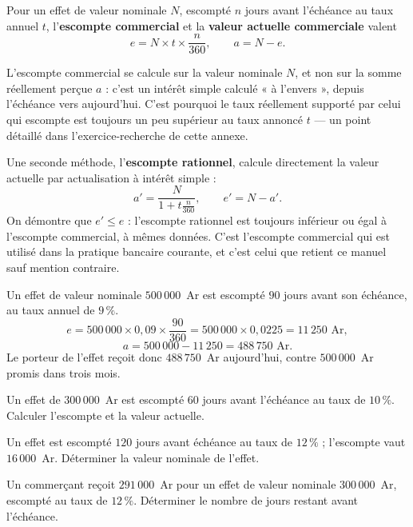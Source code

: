 \begin{theoreme}
Pour un effet de valeur nominale $N$, escompté $n$ jours avant l'échéance au
taux annuel $t$, l'\textbf{escompte commercial} et la \textbf{valeur
actuelle commerciale} valent
\[
  e = N \times t \times \frac{n}{360}, \qquad
  a = N-e .
\]
\end{theoreme}

\begin{avertissement}
L'escompte commercial se calcule sur la valeur nominale $N$, et non sur la
somme réellement perçue $a$ : c'est un intérêt simple calculé « à
l'envers », depuis l'échéance vers aujourd'hui. C'est pourquoi le taux
réellement supporté par celui qui escompte est toujours un peu supérieur au
taux annoncé $t$ — un point détaillé dans l'exercice-recherche de cette
annexe.
\end{avertissement}

\begin{remarque}
Une seconde méthode, l'\textbf{escompte rationnel}, calcule directement la
valeur actuelle par actualisation à intérêt simple :
\[
  a' = \frac{N}{1+t\frac{n}{360}}, \qquad e' = N-a' .
\]
On démontre que $e' \leq e$ : l'escompte rationnel est toujours inférieur ou
égal à l'escompte commercial, à mêmes données. C'est l'escompte commercial
qui est utilisé dans la pratique bancaire courante, et c'est celui que
retient ce manuel sauf mention contraire.
\end{remarque}

\begin{exemple}
Un effet de valeur nominale $500\,000$~Ar est escompté $90$ jours avant son
échéance, au taux annuel de $9\,\%$.
\[
  e = 500\,000 \times 0{,}09 \times \frac{90}{360}
  = 500\,000 \times 0{,}0225 = 11\,250 \text{ Ar},
\]
\[
  a = 500\,000-11\,250 = 488\,750 \text{ Ar}.
\]
Le porteur de l'effet reçoit donc $488\,750$~Ar aujourd'hui, contre
$500\,000$~Ar promis dans trois mois.
\end{exemple}

\begin{entrainement}[escompte]
\exo[\niveau{1}] Un effet de $300\,000$~Ar est escompté $60$ jours avant
l'échéance au taux de $10\,\%$. Calculer l'escompte et la valeur actuelle.

\exo[\niveau{2}] Un effet est escompté $120$ jours avant échéance au taux de
$12\,\%$ ; l'escompte vaut $16\,000$~Ar. Déterminer la valeur nominale de
l'effet.

\exo[\niveau{2}] Un commerçant reçoit $291\,000$~Ar pour un effet de valeur
nominale $300\,000$~Ar, escompté au taux de $12\,\%$. Déterminer le nombre de
jours restant avant l'échéance.
\end{entrainement}

